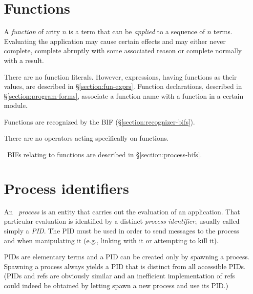 \ifStd
\section{Functions}

\label{section:functions}

A \emph{function} of arity $n$ is a term that can be \emph{applied}
to a sequence of $n$ terms.  Evaluating the application may cause
certain effects and may either never complete, complete abruptly
with some associated reason or complete normally with a result.

There are no function literals.  However,  expressions, having
functions as their values, are described in
\S\ref{section:fun-exprs}.  Function declarations, described in
\S\ref{section:program-forms}, associate a function name with a
function in a certain module.

\iffalse
An \Erlang\ system may represent functions transparently through some
other type, e.g., as tuples, in which case the recognizer BIF for that
type will be true also for tuples.  It is therefore not portable to
assume that functions are distinct from all other
types\index{function!possibly not distinct type}.  If an
implementation uses another type to represent functions, this should
be documented.
\fi

Functions are recognized by the BIF 
(\S\ref{section:recognizer-bifs}).

There are no operators acting specifically on functions.

\Erlang\ BIFs relating to functions are described in \S\ref{section:process-bifs}.
\fi

\section{Process identifiers}

\label{section:pids}

An \Erlang\ \emph{process} is an entity that carries out the
evaluation of an application.  That particular evaluation is
identified by a distinct \emph{process identifier}, usually called
simply a \emph{PID}.  The PID must be used in order to send messages
to the process and when manipulating it (e.g., linking with it or
attempting to kill it).

PIDs are elementary terms and a PID can be created only by spawning a
process.  Spawning a process always yields a PID that is distinct from
all accessible PIDs.  (PIDs and refs are obviously similar and an
inefficient implementation of refs could indeed be obtained by letting
 spawn a new process and use its PID.)

